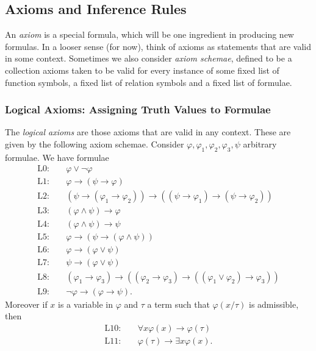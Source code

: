 \subsection{Axioms and Inference Rules}
An \emph{axiom} is a special formula, which will be one ingredient in producing new formulas. In a looser sense (for now), think of axioms as statements that are valid in some context. Sometimes we also consider \emph{axiom schemae}, defined to be a collection axioms taken to be valid for every instance of some fixed list of function symbols, a fixed list of relation symbols and a fixed list of formulae.
\subsubsection{Logical Axioms: Assigning Truth Values to Formulae}
The \emph{logical axioms} are those axioms that are valid in any context. These are given by the following axiom schemae. Consider $\varphi,\varphi_1,\varphi_2,\varphi_3,\psi$ arbitrary formulae. We have formulae
\begin{align*}
    \mathrm{L0}\colon\quad & \varphi\vee \neg\varphi\\
    \mathrm{L1}\colon\quad & \varphi\to (\psi\to \varphi)\\
    \mathrm{L2}\colon \quad & (\psi\to (\varphi_1\to \varphi_2))\to ((\psi\to \varphi_1)\to (\psi\to \varphi_2))\\
    \mathrm{L3}\colon \quad & (\varphi\wedge \psi)\to \varphi\\
    \mathrm{L4}\colon \quad & (\varphi\wedge \psi)\to \psi\\
    \mathrm{L5}\colon \quad & \varphi\to (\psi\to (\varphi\wedge \psi))\\
    \mathrm{L6}\colon \quad & \varphi \to (\varphi\vee \psi)\\
    \mathrm{L7}\colon \quad & \psi \to (\varphi \vee \psi)\\
    \mathrm{L8}\colon \quad & (\varphi_1\to \varphi_3)\to ((\varphi_2\to \varphi_3)\to ((\varphi_1\vee \varphi_2)\to \varphi_3 ))\\
    \mathrm{L9}\colon \quad & \neg\varphi \to (\varphi \to \psi).
\end{align*}
Moreover if $x$ is a variable in $\varphi$ and $\tau$ a term such that $\varphi(x/\tau)$ is admissible, then 
\begin{align*}
    \mathrm{L10}\colon \quad & \forall x\varphi(x) \to \varphi(\tau)\\
    \mathrm{L11}\colon \quad & \varphi(\tau)\to \exists x\varphi(x). 
\end{align*}
